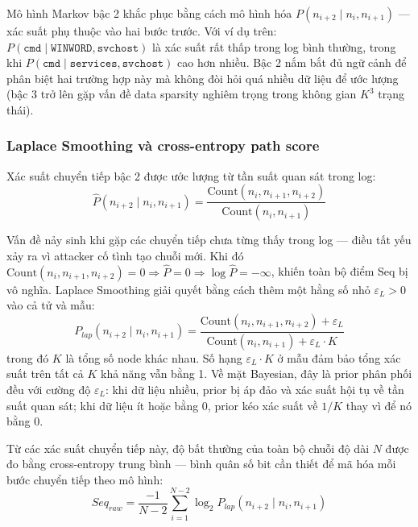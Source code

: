 \documentclass[../main.tex]{subfiles}
\begin{document}
Mô hình Markov bậc 2 khắc phục bằng cách mô hình hóa $P(n_{i+2} \mid n_i, n_{i+1})$ — xác suất phụ thuộc vào hai bước trước. Với ví dụ trên: $P(\texttt{cmd} \mid \texttt{WINWORD}, \texttt{svchost})$ là xác suất rất thấp trong log bình thường, trong khi $P(\texttt{cmd} \mid \texttt{services}, \texttt{svchost})$ cao hơn nhiều. Bậc 2 nắm bắt đủ ngữ cảnh để phân biệt hai trường hợp này mà không đòi hỏi quá nhiều dữ liệu để ước lượng (bậc 3 trở lên gặp vấn đề data sparsity nghiêm trọng trong không gian $K^3$ trạng thái).

\subsubsection{Laplace Smoothing và cross-entropy path score}
\label{subsubsection:2.4.4.2}

Xác suất chuyển tiếp bậc 2 được ước lượng từ tần suất quan sát trong log:
\begin{equation}
    \hat{P}(n_{i+2} \mid n_i, n_{i+1}) = \frac{\text{Count}(n_i, n_{i+1}, n_{i+2})}{\text{Count}(n_i, n_{i+1})} \tag{1.18}
\end{equation}

Vấn đề nảy sinh khi gặp các chuyển tiếp chưa từng thấy trong log — điều tất yếu xảy ra vì attacker cố tình tạo chuỗi mới. Khi đó $\text{Count}(n_i, n_{i+1}, n_{i+2}) = 0 \Rightarrow \hat{P} = 0 \Rightarrow \log \hat{P} = -\infty$, khiến toàn bộ điểm Seq bị vô nghĩa. Laplace Smoothing giải quyết bằng cách thêm một hằng số nhỏ $\varepsilon_L > 0$ vào cả tử và mẫu:
\begin{equation}
    P_{lap}(n_{i+2} \mid n_i, n_{i+1}) = \frac{\text{Count}(n_i, n_{i+1}, n_{i+2}) + \varepsilon_L}{\text{Count}(n_i, n_{i+1}) + \varepsilon_L \cdot K} \tag{1.19}
\end{equation}
trong đó $K$ là tổng số node khác nhau. Số hạng $\varepsilon_L \cdot K$ ở mẫu đảm bảo tổng xác suất trên tất cả $K$ khả năng vẫn bằng 1. Về mặt Bayesian, đây là prior phân phối đều với cường độ $\varepsilon_L$: khi dữ liệu nhiều, prior bị áp đảo và xác suất hội tụ về tần suất quan sát; khi dữ liệu ít hoặc bằng 0, prior kéo xác suất về $1/K$ thay vì để nó bằng 0.

Từ các xác suất chuyển tiếp này, độ bất thường của toàn bộ chuỗi độ dài $N$ được đo bằng cross-entropy trung bình — bình quân số bit cần thiết để mã hóa mỗi bước chuyển tiếp theo mô hình:
\begin{equation}
    Seq_{raw} = \frac{-1}{N-2} \sum_{i=1}^{N-2} \log_2 P_{lap}(n_{i+2} \mid n_i, n_{i+1}) \tag{1.20}
\end{equation}
\end{document}
